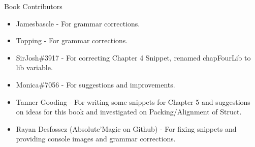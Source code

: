 \large Book Contributors \newline
\begin{itemize}
	\item Jamesbascle - For grammar corrections.
	\item Topping - For grammar corrections.
	\item SirJosh\#3917 - For correcting Chapter 4 Snippet, renamed chapFourLib to lib variable.
	\item Monica\#7056 - For suggestions and improvements.
	\item Tanner Gooding - For writing some snippets for Chapter 5 and suggestions on ideas for this book and investigated on Packing/Alignment of Struct.
	\item Rayan Desfossez (Absolute'Magic on Github) - For fixing snippets and providing console images and grammar corrections.
\end{itemize}

\newpage

